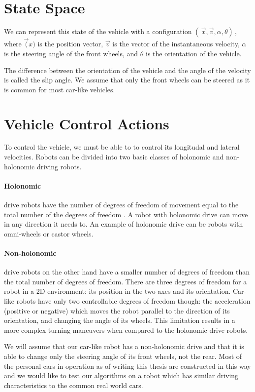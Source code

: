 \section{State Space}

We can represent this state of the vehicle with a configuration $( \, \vec{x}, \vec{v}, \alpha, \theta ) \,$, where $\vec(x)$ is the position vector, $\vec{v}$ is the vector of the instantaneous velocity, $\alpha$ is the steering angle of the front wheels, and $\theta$ is the orientation of the vehicle.

The difference between the orientation of the vehicle and the angle of the velocity is called the slip angle. We assume that only the front wheels can be steered as it is common for most car-like vehicles.

\section{Vehicle Control Actions}

To control the vehicle, we must be able to to control its longitudal and lateral velocities. Robots can be divided into two basic classes of holonomic and non-holonomic driving robots.

\paragraph{Holonomic} drive robots have the number of degrees of freedom of movement equal to the total number of the degrees of freedom \cite{}. A robot with holonomic drive can move in any direction it needs to. An example of holonomic drive can be robots with omni-wheels or castor wheels.

\paragraph{Non-holonomic} drive robots on the other hand have a smaller number of degrees of freedom than the total number of degrees of freedom. There are three degrees of freedom for a robot in a 2D environment: its position in the two axes and its orientation. Car-like robots have only two controllable degrees of freedom though: the acceleration (positive or negative) which moves the robot parallel to the direction of its orientation, and changing the angle of its wheels. This limitation results in a more complex turning maneuvers when compared to the holonomic drive robots.

We will assume that our car-like robot has a non-holonomic drive and that it is able to change only the steering angle of its front wheels, not the rear. Most of the personal cars in operation as of writing this thesis are constructed in this way and we would like to test our algorithms on a robot which has similar driving characteristics to the common real world cars.

